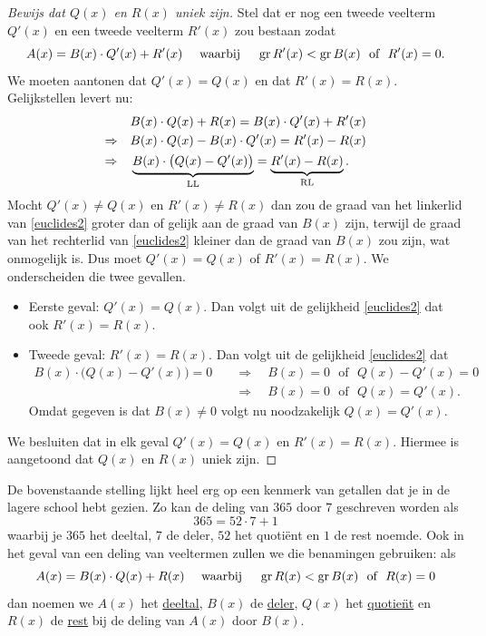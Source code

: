 \documentclass{ximera}
\begin{document}

\begin{proof}[Bewijs dat $Q(x)$ en $R(x)$ uniek zijn] Stel dat er nog een tweede veelterm $Q'(x)$ en een tweede veelterm $R'(x)$ zou bestaan zodat
\[
A(x) = B(x)\cdot Q'(x) + R'(x) \quad \text{ waarbij } \quad \operatorname{gr} R'(x) < \operatorname{gr} B(x) \,\, \text{ of } \,\, R'(x) = 0.
\]
We moeten aantonen dat $Q'(x) = Q(x)$ en dat $R'(x) = R(x)$. Gelijkstellen levert nu:
\begin{align}
& B(x) \cdot Q(x) + R(x) = B(x) \cdot Q'(x) + R'(x) \notag \\
\Rightarrow \quad & B(x) \cdot Q(x) - B(x) \cdot Q'(x) = R'(x) - R(x) \notag \\
\Rightarrow \quad & \underbrace{B(x) \cdot \bigl(Q(x) - Q'(x)\bigr)}_{\text{LL}} = \underbrace{R'(x) - R(x)}_{\text{RL}}. \label{euclides2}
\end{align}
Mocht $Q'(x) \neq Q(x)$ en $R'(x) \neq R(x)$ dan zou de graad van het linkerlid van \eqref{euclides2} groter dan of gelijk aan de graad van $B(x)$ zijn, terwijl de graad van het rechterlid van \eqref{euclides2} kleiner dan de graad van $B(x)$ zou zijn, wat onmogelijk is. Dus moet $Q'(x) = Q(x)$ of $R'(x) = R(x)$. We onderscheiden die twee gevallen.
\begin{itemize}
\item[]
Eerste geval: $Q'(x) = Q(x)$. Dan volgt uit de gelijkheid \eqref{euclides2} dat ook $R'(x) = R(x)$.  
\item[]
Tweede geval: $R'(x) = R(x)$. Dan volgt uit de gelijkheid \eqref{euclides2} dat
\begin{align*}
B(x) \cdot \bigl(Q(x) - Q'(x)\bigr) = 0 \quad 
& \Rightarrow \quad B(x) = 0 \,\, \text{ of } \,\, Q(x) - Q'(x) = 0 \\
& \Rightarrow \quad B(x) = 0 \,\, \text{ of } \,\, Q(x) = Q'(x). 
\end{align*}
Omdat gegeven is dat $B(x) \neq 0$ volgt nu noodzakelijk $Q(x) = Q'(x)$.
\end{itemize}
We besluiten dat in elk geval $Q'(x) = Q(x)$ en $R'(x) = R(x)$. Hiermee is aangetoond dat $Q(x)$ en $R(x)$ uniek zijn. 
\end{proof}

De bovenstaande stelling lijkt heel erg op een kenmerk van getallen dat je in de lagere school hebt gezien. Zo kan de deling van $365$ door $7$ geschreven worden als
\[
365 = 52 \cdot 7 + 1
\]
waarbij je $365$ het deeltal, $7$ de deler, $52$ het quoti\"ent en $1$ de rest noemde. Ook in het geval van een deling van veeltermen zullen we die benamingen gebruiken: als
\[
A(x) = B(x)\cdot Q(x) + R(x) \quad \text{ waarbij } \quad \operatorname{gr} R(x) < \operatorname{gr} B(x) \,\, \text{ of } \,\, R(x) = 0
\]
dan noemen we $A(x)$ het \underline{deeltal}, $B(x)$ de \underline{deler}, $Q(x)$ het \underline{quotie\"nt} en $R(x)$ de \underline{rest} bij de deling van $A(x)$ door $B(x)$. 
\end{document}
